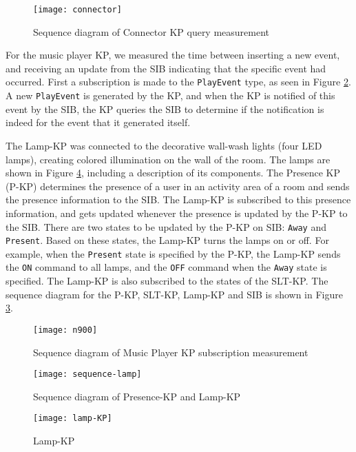 \begin{figure}
\centering
\texttt{[image: connector]}
\caption{Sequence diagram of Connector KP query measurement}
\label{connectorseq}
\end{figure}

For the music player KP, we measured the time between inserting a new event, and receiving an update from the SIB indicating that the specific event had occurred. First a subscription is made to the \texttt{PlayEvent} type, as seen in Figure \ref{N900}. A new \texttt{PlayEvent} is generated by the KP, and when the KP is notified of this event by the SIB, the KP queries the SIB to determine if the notification is indeed for the event that it generated itself.

The Lamp-KP was connected to the decorative wall-wash lights (four LED lamps), creating colored illumination on the wall of the room. The lamps are shown in Figure \ref{lamp-KP}, including a description of its components. The Presence KP (P-KP) determines the presence of a user in an activity area of a room and sends the presence information to the SIB. The Lamp-KP is subscribed to this presence information, and gets updated whenever the presence is updated by the P-KP to the SIB. There are two states to be updated by the P-KP on SIB: \texttt{Away} and \texttt{Present}. Based on these states, the Lamp-KP turns the lamps on or off. For example, when the \texttt{Present} state is specified by the P-KP, the Lamp-KP sends  the \texttt{ON} command to all lamps, and the \texttt{OFF} command when the \texttt{Away} state is specified.  The Lamp-KP is also subscribed to the states of the SLT-KP. The sequence diagram for the P-KP, SLT-KP, Lamp-KP and SIB is shown in Figure \ref{sequence-lamp}.


\begin{figure}
\centering
\texttt{[image: n900]}
\caption{Sequence diagram of Music Player KP subscription measurement}
\label{N900}
\end{figure}

\begin{figure}
\centering
\texttt{[image: sequence-lamp]}
\caption{Sequence diagram of Presence-KP and Lamp-KP}
\label{sequence-lamp}
\end{figure}

\begin{figure}
\centering
\texttt{[image: lamp-KP]}
\caption{Lamp-KP}
\label{lamp-KP}
\end{figure}


